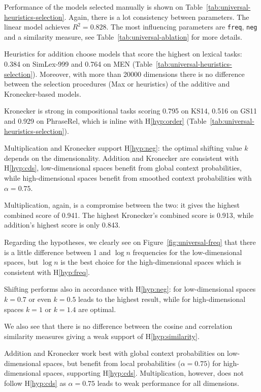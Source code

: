 

Performance of the models selected manually is shown on Table~\ref{tab:universal-heuristics-selection}. Again, there is a lot consistency between parameters. The linear model achieves $R^2 = 0.828$. The most influencing parameters are \texttt{freq}, \texttt{neg} and a similarity measure, see Table~\ref{tab:universal-ablation} for more details.

Heuristics for addition choose models that score the highest on lexical tasks: 0.384 on SimLex-999 and 0.764 on MEN (Table~\ref{tab:universal-heuristics-selection}). Moreover, with more than 20000 dimensions there is no difference between the selection procedures (Max or heuristics) of the additive and Kronecker-based models.

Kronecker is strong in compositional tasks scoring 0.795 on KS14, 0.516 on GS11 and 0.929 on PhraseRel, which is inline with H\ref{hyp:order} (Table~\ref{tab:universal-heuristics-selection}).

Multiplication and Kronecker support H\ref{hyp:neg}: the optimal shifting value $k$ depends on the dimensionality. Addition and Kronecker are consistent with H\ref{hyp:cds}, low-dimensional spaces benefit from global context probabilities, while high-dimensional spaces benefit from smoothed context probabilities with $\alpha=0.75$.

Multiplication, again, is a compromise between the two: it gives the highest combined score of 0.941. The highest Kronecker's combined score is 0.913, while addition's highest score is only 0.843.

Regarding the hypotheses, we clearly see on Figure~\ref{fig:universal-freq} that there is a little difference between 1 and $\log n$ frequencies for the low-dimensional spaces, but $\log n$ is the best choice for the high-dimensional spaces which is consistent with H\ref{hyp:freq}.

Shifting performs also in accordance with H\ref{hyp:neg}: for low-dimensional spaces $k=0.7$ or even $k=0.5$ leads to the highest result, while for high-dimensional spaces $k=1$ or $k=1.4$ are optimal.

We also see that there is no difference between the cosine and correlation similarity measures giving a weak support of H\ref{hyp:similarity}.

Addition and Kronecker work best with global context probabilities on low-dimensional spaces, but benefit from local probabilities ($\alpha=0.75$) for high-dimensional spaces, supporting H\ref{hyp:cds}. Multiplication, however, does not follow H\ref{hyp:cds} as $\alpha=0.75$ leads to weak performance for all dimensions.

